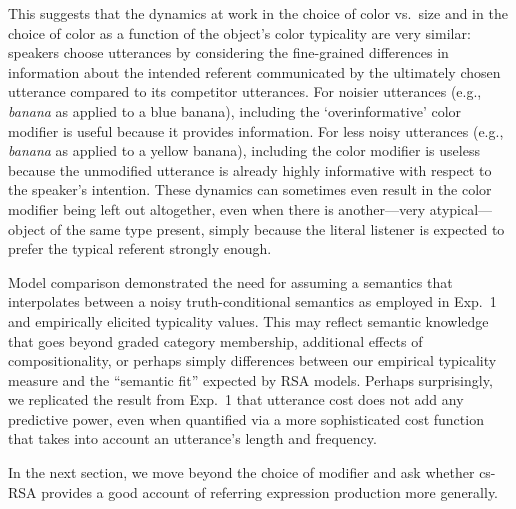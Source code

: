 \documentclass[11pt]{article}
\newcommand{\jd}[1]{\textcolor{Red}{[jd: #1]}}
\newcommand{\ndg}[1]{\textcolor{Green}{[ndg: #1]}}
\begin{document}
This suggests that the dynamics at work in the choice of color vs.~size and in the choice of color as a function of the object's color typicality are very similar: speakers choose utterances by considering the fine-grained differences in information about the intended referent communicated by the ultimately chosen utterance compared to its competitor utterances. For noisier utterances (e.g., \emph{banana} as applied to a blue banana), including the `overinformative' color modifier is useful because it provides information. For less noisy utterances (e.g., \emph{banana} as applied to a yellow banana), including the color modifier is useless because the unmodified utterance is already highly informative with respect to the speaker's intention. These dynamics can sometimes even result in the color modifier being left out altogether, even when there is another---very atypical---object of the same type present, simply because the literal listener is expected to prefer the typical referent strongly enough.

Model comparison demonstrated the need for assuming a semantics that interpolates between a noisy truth-conditional semantics as employed in Exp.~1 and empirically elicited typicality values. 
This may reflect semantic knowledge that goes beyond graded category membership, additional effects of compositionality, or perhaps simply differences between our empirical typicality measure and the ``semantic fit'' expected by RSA models.
Perhaps surprisingly, we replicated the result from Exp.~1 that utterance cost does not add any predictive power, even when quantified via a more sophisticated cost function that takes into account an utterance's length and frequency.

In the next section, we move beyond the choice of modifier and ask whether cs-RSA provides a good account of  referring expression production more generally.
\end{document}
